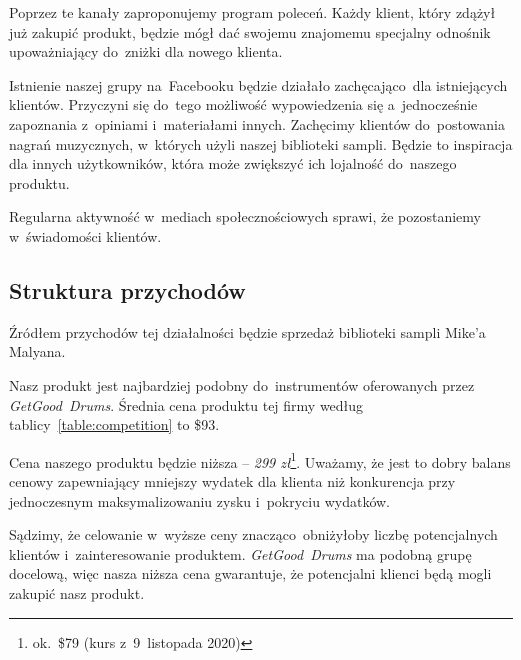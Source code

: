 \documentclass[12pt]{article}
\newcommand{\productpricezl}{299 zł\xspace}
\begin{document}
Poprzez te kanały zaproponujemy program poleceń.
Każdy klient, który zdążył już zakupić produkt, będzie mógł dać swojemu znajomemu specjalny odnośnik upoważniający do~zniżki dla nowego klienta.

Istnienie naszej grupy na~Facebooku będzie działało zachęcająco~dla istniejących klientów.
Przyczyni się do~tego możliwość wypowiedzenia się a~jednocześnie zapoznania z~opiniami i~materiałami innych.
Zachęcimy klientów do~postowania nagrań muzycznych, w~których użyli naszej biblioteki sampli.
Będzie to inspiracja dla innych użytkowników, która może zwiększyć ich lojalność do~naszego produktu.

Regularna aktywność w~mediach społecznościowych sprawi, że pozostaniemy w~świadomości klientów.

\subsection{Struktura przychodów}


Źródłem przychodów tej działalności będzie sprzedaż biblioteki sampli Mike'a Malyana.

Nasz produkt jest najbardziej podobny do~instrumentów oferowanych przez \textit{GetGood~Drums}.
Średnia cena produktu tej firmy według tablicy~\ref{table:competition} to \$93.

Cena naszego produktu będzie niższa -- \emph{\productpricezl}\footnote{ok.~\$79 (kurs z~9~listopada 2020)}.
Uważamy, że jest to dobry balans cenowy zapewniający mniejszy wydatek dla klienta niż konkurencja przy jednoczesnym maksymalizowaniu zysku i~pokryciu wydatków.

Sądzimy, że celowanie w~wyższe ceny znacząco~obniżyłoby liczbę potencjalnych klientów i~zainteresowanie produktem.
\textit{GetGood~Drums} ma podobną grupę docelową, więc nasza niższa cena gwarantuje, że potencjalni klienci będą mogli zakupić nasz produkt.

\end{document}
